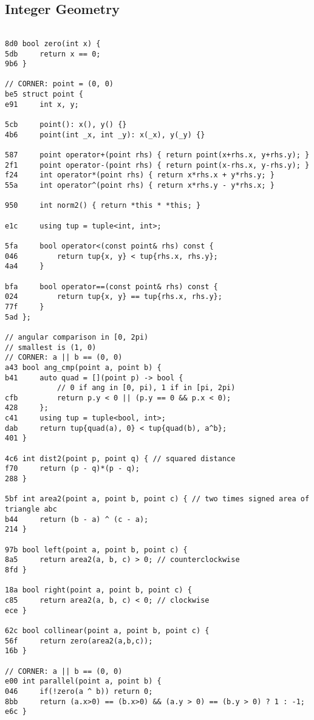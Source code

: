 \documentclass[11pt, a4paper, twoside]{article}
\begin{document}
\subsection{Integer Geometry}
\begin{lstlisting}

8d0 bool zero(int x) {
5db 	return x == 0;
9b6 }

// CORNER: point = (0, 0)
be5 struct point {
e91 	int x, y;
    	
5cb 	point(): x(), y() {}
4b6 	point(int _x, int _y): x(_x), y(_y) {}
    	
587 	point operator+(point rhs) { return point(x+rhs.x, y+rhs.y); }
2f1 	point operator-(point rhs) { return point(x-rhs.x, y-rhs.y); }
f24 	int operator*(point rhs) { return x*rhs.x + y*rhs.y; }
55a 	int operator^(point rhs) { return x*rhs.y - y*rhs.x; }
    
950 	int norm2() { return *this * *this; }
    
e1c 	using tup = tuple<int, int>;
    
5fa 	bool operator<(const point& rhs) const {
046 		return tup{x, y} < tup{rhs.x, rhs.y};
4a4 	}
    	
bfa 	bool operator==(const point& rhs) const {
024 		return tup{x, y} == tup{rhs.x, rhs.y};
77f 	}
5ad };

// angular comparison in [0, 2pi)
// smallest is (1, 0)
// CORNER: a || b == (0, 0)
a43 bool ang_cmp(point a, point b) {
b41 	auto quad = [](point p) -> bool {
    		// 0 if ang in [0, pi), 1 if in [pi, 2pi)
cfb 		return p.y < 0 || (p.y == 0 && p.x < 0);
428 	};
c41 	using tup = tuple<bool, int>;
dab 	return tup{quad(a), 0} < tup{quad(b), a^b};
401 }

4c6 int dist2(point p, point q) { // squared distance
f70     return (p - q)*(p - q);
288 }

5bf int area2(point a, point b, point c) { // two times signed area of triangle abc
b44 	return (b - a) ^ (c - a);
214 }

97b bool left(point a, point b, point c) {
8a5 	return area2(a, b, c) > 0; // counterclockwise
8fd }

18a bool right(point a, point b, point c) {
c85 	return area2(a, b, c) < 0; // clockwise
ece }

62c bool collinear(point a, point b, point c) {
56f 	return zero(area2(a,b,c));
16b }

// CORNER: a || b == (0, 0)
e00 int parallel(point a, point b) {
046 	if(!zero(a ^ b)) return 0;
8bb 	return (a.x>0) == (b.x>0) && (a.y > 0) == (b.y > 0) ? 1 : -1;
e6c }


\end{lstlisting}
\end{document}
